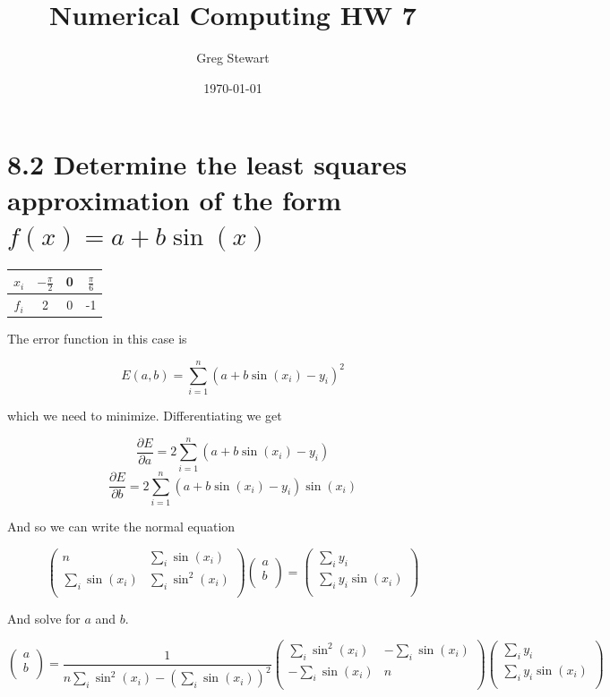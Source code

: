 \documentclass{article}
\title{Numerical Computing HW 7}
\author{Greg Stewart}
\date{\today}
\begin{document}
\maketitle

\section*{8.2 \normalsize Determine the least squares approximation of the form $f(x) = a + b\sin(x)$}

\begin{table}[h!]
  \centering
  \begin{tabular} {c | c c c }
    $x_i$ & $-\frac{\pi}{2}$ & 0 & $\frac{\pi}{6}$ \\ 
    \hline  
    $f_i$ & 2 & 0 & -1 \\
  \end{tabular}
\end{table}

The error function in this case is

$$E(a,b) = \sum_{i=1}^n (a + b\sin(x_i) - y_i)^2$$

which we need to minimize. Differentiating we get

$$\frac{\partial E}{\partial a} = 2\sum_{i=1}^n (a + b\sin(x_i) - y_i)$$
$$\frac{\partial E}{\partial b} = 2\sum_{i=1}^n (a + b\sin(x_i) - y_i)\sin(x_i)$$

And so we can write the normal equation

\[
  \begin{pmatrix}
    n & \sum_i \sin(x_i) \\ \sum_i \sin(x_i) & \sum_i \sin^2(x_i) \\
  \end{pmatrix}
  \begin{pmatrix}
    a \\ b \\
  \end{pmatrix}
  =
  \begin{pmatrix}
    \sum_{i} y_i \\ \sum_i y_i\sin(x_i) \\
  \end{pmatrix}
\]

And solve for $a$ and $b$.

\[
  \begin{pmatrix}
    a \\ b \\
  \end{pmatrix}
  =
  \frac{1}{n\sum_i \sin^2(x_i) - (\sum_i\sin(x_i))^2}
  \begin{pmatrix}
    \sum_i\sin^2(x_i) & -\sum_i\sin(x_i) \\ -\sum_i\sin(x_i) & n \\
  \end{pmatrix}
  \begin{pmatrix}
    \sum_i y_i \\ \sum_i y_i\sin(x_i) \\
  \end{pmatrix}
\]
\end{document}
